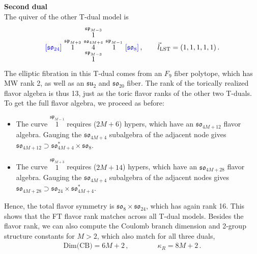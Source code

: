 \documentclass[11pt]{article}
\numberwithin{equation}{section}
\newcommand\myoverset[2]{\overset{\textstyle #1\mathstrut}{#2}}
\newcommand\myunderset[2]{\underset{\textstyle #1\mathstrut}{#2}}
\newcommand{\fsu}{\mathfrak{su}}
\newcommand{\fso}{\mathfrak{so}}
\newcommand{\LST}{\text{LST}\xspace}
\begin{document}
\textbf{Second dual}\\
The quiver of the other T-dual model is
\begin{align}
\textcolor{blue}{\lbrack  \mathfrak{so}_{24}\rbrack}     \, \,   
{\overset{\mathfrak{sp}_{M+3}}{1}}   \, \,  
\myoverset{\overset{\mathfrak{sp}_{M-3}}{1}}
{\myunderset{\overset{\mathfrak{sp}_{M-3}}{1}}
{\overset{\mathfrak{so}_{4M+4}}{4}}}  \, \, 
{\overset{\mathfrak{sp}_{M-1}}{1}} \, \,
\textcolor{blue}{\lbrack \mathfrak{so}_{8} \rbrack}   \, ,   \qquad 
\vec{l}_{\LST}=(1,1,1,1,1) \, .
\end{align}
The elliptic fibration in this T-dual comes from an $F_{9}$ fiber polytope, which has MW rank 2, as well as an $\fsu_2$ and $\fso_{20}$ fiber. The rank of the torically realized flavor algebra is thus 13, just as the toric flavor ranks of the other two T-duals. To get the full flavor algebra, we proceed as before:
\begin{itemize}
    \item The curve ${\overset{\mathfrak{sp}_{M-1}}{1}}$ requires ($2M+6$) hypers, which have an $\mathfrak{so}_{4M+12}$ flavor algebra. Gauging the $\mathfrak{so}_{4M+4}$ subalgebra of the adjacent node gives $ \mathfrak{so}_{4M+12}\supset\mathfrak{so}_{4M+4}^{*}\times \mathfrak{so}_{8}$.
    \item The curve ${\overset{\mathfrak{sp}_{M+3}}{1}}$ requires ($2M+14$) hypers, which have an $\mathfrak{so}_{4M+28}$ flavor algebra. Gauging the $\mathfrak{so}_{4M+4}$ subalgebra of the adjacent nodes gives $\mathfrak{so}_{4M+28}\supset\mathfrak{so}_{24} \times \mathfrak{so}_{4M+4}^{*}$.
\end{itemize}
Hence, the total flavor symmetry is $\mathfrak{so}_{8} \times \mathfrak{so}_{24}$, which has again rank 16. This shows that the FT flavor rank matches across all T-dual models. Besides the flavor rank, we can also compute the Coulomb branch dimension and 2-group structure constants for $M>2$, which also match for all three duals,
\begin{align}
\text{Dim(CB)}=6M +2 \, , \qquad\qquad \kappa_{R}=8M+2\, .
\end{align} 
\end{document}

